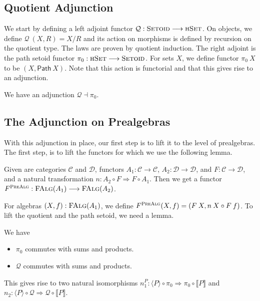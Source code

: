 \documentclass[9pt]{entcs}
\newcommand{\type}[1]{\textsc{#1}}
\newcommand{\category}[1]{\textsc{#1}}
\newcommand{\function}[1]{\mathsf{#1}}
\newcommand{\hset}{\type{hSet}} %
\newcommand{\0}{\textbf{0}} %
\newcommand{\setquot}[2]{#1 / #2} %
\newcommand{\compm}[2]{#2 \circ #1} %
\newcommand{\setoids}{\category{Setoid}} %
\newcommand{\functor}[2]{#1 \longrightarrow #2} %
\newcommand{\compf}[2]{#2 \circ #1} %
\newcommand{\nattrans}[2]{#1 \Longrightarrow #2} %
\newcommand{\falg}[1]{\category{FAlg}(#1)} %
\newcommand{\adj}[2]{#1 \dashv #2} %
\newcommand{\pathR}[1]{\function{Path} \> #1} %
\newcommand{\semP}[1]{\llbracket #1 \rrbracket} %
\newcommand{\semPT}[1]{\langle #1 \rangle} %
\newcommand{\quotF}{\mathcal{Q}}
\newcommand{\pathF}{\pi_0}
\begin{document}
\subsection{Quotient Adjunction}
We start by defining a left adjoint functor $\quotF : \functor{\setoids}{\hset}$.
On objects, we define $\quotF \> (X , R) = \setquot{X}{R}$ and its action on morphisms is defined by recursion on the quotient type.
The laws are proven by quotient induction.
The right adjoint is the path setoid functor $\pathF : \functor{\hset}{\setoids}$.
For sets $X$, we define functor $\pathF \> X$ to be $(X, \pathR{X})$.
Note that this action is functorial and that this gives rise to an adjunction.

\begin{lemma}
We have an adjunction $\adj{\quotF}{\pathF}$.
\end{lemma}

\subsection{The Adjunction on Prealgebras}
With this adjunction in place, our first step is to lift it to the level of prealgebras.
The first step, is to lift the functors for which we use the following lemma.

\begin{lemma}
\label{lem:prealgadj}
Given are categories $\mathcal{C}$ and $\mathcal{D}$, functors $A_1 : \functor{\mathcal{C}}{\mathcal{C}}$, $A_2 : \functor{\mathcal{D}}{\mathcal{D}}$, and $F : \functor{\mathcal{C}}{\mathcal{D}}$, and a natural transformation $n : \nattrans{\compf{F}{A_2}}{\compf{A_1}{F}}$.
Then we get a functor $F^{\category{PreAlg}} : \functor{\falg{A_1}}{\falg{A_2}}$.
\end{lemma}

For algebras $(X, f) : \falg{A_1}$, we define $F^{\category{PreAlg}}(X,f) = (F \> X, \compm{F \> f}{n \> X})$.
To lift the quotient and the path setoid, we need a lemma.

\begin{lemma}
\label{lem:comm}
We have
\begin{itemize}
	\item $\pathF$ commutes with sums and products.
	\item $\quotF$ commutes with sums and products.
\end{itemize}
This gives rise to two natural isomorphisms $n_1^P : \nattrans{\compf{\pathF}{\semPT{P}}}{\compf{\semP{P}}{\pathF}}$ and $n_2 : \nattrans{\compf{\quotF}{\semPT{P}}}{\compf{\semP{P}}{\quotF}}$.
\end{lemma}
\end{document}
